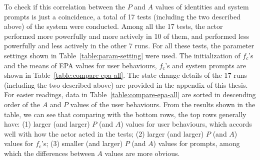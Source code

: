 To check if this correlation between the $P$ and $A$ values of identities and system prompts is just a coincidence, a total of 17 tests (including the two described above) of the system were conducted. Among all the 17 tests, the actor performed more powerfully and more actively in 10 of them, and performed less powerfully and less actively in the other 7 runs. For all these tests, the parameter settings shown in Table~\ref{table:param-setting} were used. The initialization of $f_c$'s and the means of EPA values for user behaviours, $f_c$'s and system prompts are shown in Table~\ref{table:compare-epa-all}. The state change details of the 17 runs (including the two described above) are provided in the appendix of this thesis. For easier readings, data in Table~\ref{table:compare-epa-all} are sorted in descending order of the $A$ and $P$ values of the user behaviours. From the results shown in the table, we can see that comparing with the bottom rows, the top rows generally have:
(1) larger (and larger) $P$ (and $A$) values for user behaviours, which accords well with how the actor acted in the tests;
(2) larger (and larger) $P$ (and $A$) values for $f_c$'s;
(3) smaller (and larger) $P$ (and $A$) values for prompts, among which the differences between $A$ values are more obvious.

